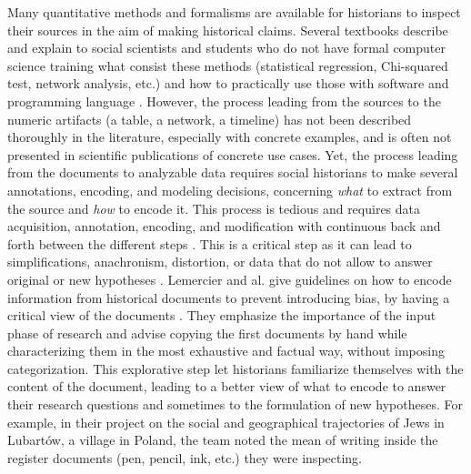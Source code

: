 Many quantitative methods and formalisms are available for historians to inspect their sources in the aim of making historical claims.
Several textbooks describe and explain to social scientists and students who do not have formal computer science training what consist these methods (statistical regression, Chi-squared test, network analysis, etc.) and how to practically use those with software and programming language \cite{floudIntroductionQuantitativeMethods2013}.
However, the process leading from the sources to the numeric artifacts (a table, a network, a timeline) has not been described thoroughly in the literature, especially with concrete examples, and is often not presented in scientific publications of concrete use cases.
Yet, the process leading from the documents to analyzable data requires social historians to make several annotations, encoding, and modeling decisions, concerning \emph{what} to extract from the source and \emph{how} to encode it.
This process is tedious and requires data acquisition, annotation, encoding, and modification with continuous back and forth between the different steps \cite{alkadi2022}.
This is a critical step as it can lead to simplifications, anachronism, distortion, or data that do not allow to answer original or new hypotheses \cite{karila-cohenNouvellesCuisinesHistoire2018, lemercierQuantitativeMethodsHumanities2019}.
Lemercier and al. give guidelines on how to encode information from historical documents to prevent introducing bias, by having a critical view of the documents \cite{lemercierBackSourcesPracticing2021}.
They emphasize the importance of the input phase of research and advise copying the first documents by hand while characterizing them in the most exhaustive and factual way, without imposing categorization.
This explorative step let historians familiarize themselves with the content of the document, leading to a better view of what to encode to answer their research questions and sometimes to the formulation of new hypotheses.
For example, in their project on the social and geographical trajectories of Jews in Lubartów\cite{zakrzewski1932PopulationRegister2020}, a village in Poland, the team noted the mean of writing inside the register documents (pen, pencil, ink, etc.) they were inspecting.
